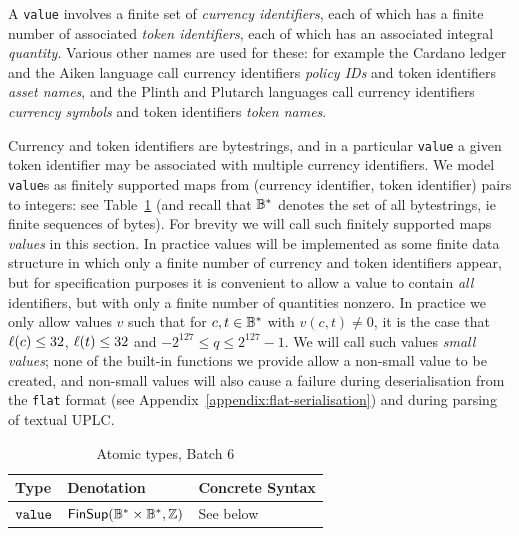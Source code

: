 A \texttt{value} involves a finite set of \textit{currency identifiers}, each of
which has a finite number of associated \textit{token identifiers}, each of
which has an associated integral \textit{quantity}. Various other names are used
for these: for example the Cardano ledger and the Aiken language call currency
identifiers \textit{policy IDs} and token identifiers \textit{asset names}, and
the Plinth and Plutarch languages call currency identifiers \textit{currency
symbols} and token identifiers \textit{token names}.

Currency and token identifiers are bytestrings, and in a
particular \texttt{value} a given token identifier may be associated with
multiple currency identifiers.  We model \texttt{value}s as finitely supported
maps from (currency identifier, token identifier) pairs to integers: see
Table~\ref{table:built-in-value-type} (and recall that $\mathbb{B}^*$ denotes the set of
all bytestrings, ie finite sequences of bytes).  For brevity we will call such
finitely supported maps \textit{values} in this section.  In
practice values will be implemented as some finite data structure in
which only a finite number of currency and token identifiers appear, but for
specification purposes it is convenient to allow a value to
contain \textit{all} identifiers, but with only a finite number of quantities
nonzero.  In practice we only allow values $v$ such that for $c, t \in \mathbb{B}^*$
with $v(c,t) \neq 0$, it is the case that $\operatorname{\ell}(c) \leq 32$, $\operatorname{\ell}(t) \leq
32$ and $-2^{127} \leq q \leq 2^{127}-1$.  We will call such
values \textit{small values}; none of the built-in functions we provide allow a
non-small value to be created, and non-small values will also cause a failure
during deserialisation from the \texttt{flat} format (see
Appendix~\ref{appendix:flat-serialisation}) and during parsing of textual UPLC.


\begin{table}[H]
  \centering
    \begin{tabular}{|l|p{3cm}|l|}
        \hline
        Type & Denotation & Concrete Syntax\\
        \hline
        $\mathtt{value}$ & $\mathsf{FinSup}(\mathbb{B}^* \times \mathbb{B}^*, \mathbb{Z})$ & See below\\
        \hline
    \end{tabular}
    \caption{Atomic types, Batch 6}
    \label{table:built-in-value-type}
\end{table}

